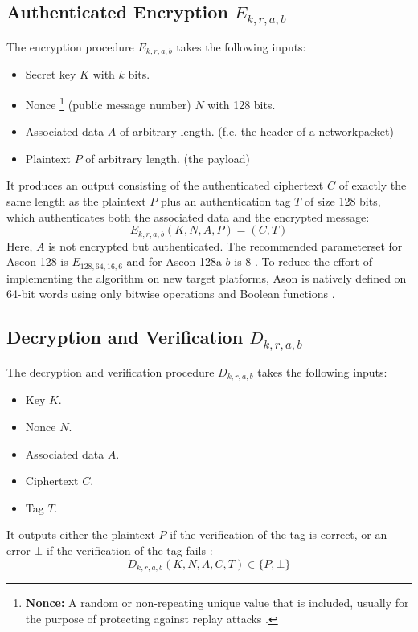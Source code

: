 \subsection{Authenticated Encryption $E_{k,r,a,b}$}
The encryption procedure $E_{k,r,a,b}$ takes the following inputs:
\begin{itemize}
    \item Secret key $K$ with $k$ bits.
    \item Nonce \footnote[2]{\textbf{Nonce:} A random or non-repeating unique value that is included, usually for the purpose of protecting against replay attacks \cite[Page 200]{rfc4949}.} (public message number) $N$ with 128 bits. 
    \item Associated data $A$ of arbitrary length. (f.e. the header of a networkpacket)
    \item Plaintext $P$ of arbitrary length. (the payload)
\end{itemize}
It produces an output consisting of the authenticated ciphertext $C$ of exactly the same length as the plaintext $P$ plus an authentication tag $T$ of size 128 bits, which authenticates both the associated data and the encrypted message:
\[
E_{k,r,a,b}(K,N,A,P) = (C,T)
\]
Here, $A$ is not encrypted but authenticated. 
The recommended parameterset for Ascon-128 is $E_{128,64,16,6}$ and for Ascon-128a $b$ is 8 \cite[Chapter 2.2]{DBLP:journals/joc/DobraunigEMS21}. \newline
To reduce the effort of implementing the algorithm on new target platforms, Ason is natively defined on 64-bit words using only bitwise operations and Boolean functions \cite[Chapter 4.1]{DBLP:journals/joc/DobraunigEMS21}. \par

\subsection{Decryption and Verification $D_{k,r,a,b}$}
The decryption and verification procedure $D_{k,r,a,b}$ takes the following inputs:
\begin{itemize}
    \item Key $K$.
    \item Nonce $N$.
    \item Associated data $A$.
    \item Ciphertext $C$.
    \item Tag $T$.
\end{itemize}
It outputs either the plaintext $P$ if the verification of the tag is correct, or an error $\bot$ if the verification of the tag fails \cite{DBLP:journals/joc/DobraunigEMS21}:
\[
D_{k,r,a,b}(K,N,A,C,T) \in \{P, \bot\}
\]

